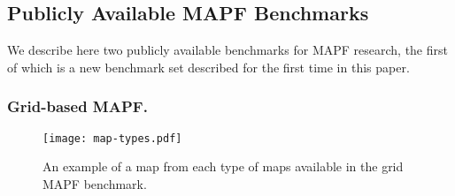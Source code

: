 \documentclass[letterpaper]{article} %
\newcommand{\mapf}{\ac{MAPF}\xspace}
\begin{document}
\subsection{Publicly Available \mapf Benchmarks}
We describe here two publicly available benchmarks for \mapf research, the first of which is a new benchmark set described for the first time in this paper.
\subsubsection{Grid-based \mapf.}
\begin{figure}[tb]
    \centering
    \texttt{[image: map-types.pdf]}
    \caption{An example of a map from each type of maps available in the grid \mapf benchmark.}
    \label{fig:map-types}
\end{figure}
\begin{table}
\end{table}
\end{document}
